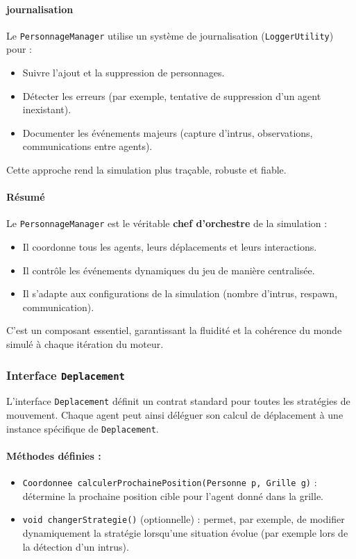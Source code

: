 \vspace{1em}
\paragraph{journalisation}

Le \texttt{PersonnageManager} utilise un système de journalisation (\texttt{LoggerUtility}) pour :
\begin{itemize}
    \item Suivre l’ajout et la suppression de personnages.
    \item Détecter les erreurs (par exemple, tentative de suppression d’un agent inexistant).
    \item Documenter les événements majeurs (capture d'intrus, observations, communications entre agents).
\end{itemize}
Cette approche rend la simulation plus traçable, robuste et fiable.

\bigskip
\paragraph{Résumé}
Le \texttt{PersonnageManager} est le véritable \textbf{chef d’orchestre} de la simulation :
\begin{itemize}
    \item Il coordonne tous les agents, leurs déplacements et leurs interactions.
    \item Il contrôle les événements dynamiques du jeu de manière centralisée.
    \item Il s’adapte aux configurations de la simulation (nombre d’intrus, respawn, communication).
\end{itemize}
C’est un composant essentiel, garantissant la fluidité et la cohérence du monde simulé à chaque itération du moteur.


\subsubsection{ Interface \texttt{Deplacement}}

L'interface \texttt{Deplacement} définit un contrat standard pour toutes les stratégies de mouvement.  
Chaque agent peut ainsi déléguer son calcul de déplacement à une instance spécifique de \texttt{Deplacement}.

\paragraph{Méthodes définies :}
\begin{itemize}
    \item \texttt{Coordonnee calculerProchainePosition(Personne p, Grille g)} : détermine la prochaine position cible pour l'agent donné dans la grille.
    \item \texttt{void changerStrategie()} (optionnelle) : permet, par exemple, de modifier dynamiquement la stratégie lorsqu'une situation évolue (par exemple lors de la détection d'un intrus).
\end{itemize}

